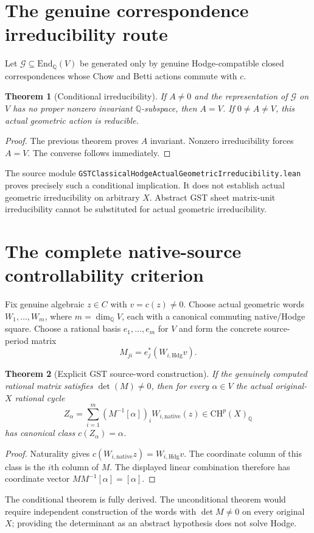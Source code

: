 \documentclass[11pt]{article}
\newcommand{\Q}{\mathbb Q}
\newcommand{\CH}{\mathrm{CH}}
\newcommand{\Hdg}{\mathrm{Hdg}}
\newtheorem{theorem}{Theorem}
\begin{document}
\section{The genuine correspondence irreducibility route}
Let $\mathscr G\subseteq\mathrm{End}_{\Q}(V)$ be generated
only by genuine Hodge-compatible closed correspondences whose
Chow and Betti actions commute with $c$.
\begin{theorem}[Conditional irreducibility]
If $A\ne0$ and the representation of $\mathscr G$ on $V$
has no proper nonzero invariant $\Q$-subspace, then $A=V$.
If $0\ne A\ne V$, this actual geometric action is reducible.
\end{theorem}
\begin{proof}
The previous theorem proves $A$ invariant. Nonzero
irreducibility forces $A=V$. The converse follows immediately.
\end{proof}
The source module
\texttt{GSTClassicalHodgeActualGeometricIrreducibility.lean}
proves precisely such a conditional implication.
It does not establish actual geometric irreducibility on
arbitrary $X$. Abstract GST sheet matrix-unit irreducibility
cannot be substituted for actual geometric irreducibility.

\section{The complete native-source controllability criterion}
Fix genuine algebraic $z\in C$ with $v=c(z)\ne0$.
Choose actual geometric words $W_1,\ldots,W_m$,
where $m=\dim_{\Q}V$, each with a canonical commuting
native/Hodge square. Choose a rational basis $e_1,\ldots,e_m$
for $V$ and form the concrete source-period matrix
\[
 M_{ji}=e_j^*(W_{i,\Hdg}v).
\]
\begin{theorem}[Explicit GST source-word construction]
If the genuinely computed rational matrix satisfies
$\det(M)\ne0$, then for every $\alpha\in V$ the actual
original-$X$ rational cycle
\[
 Z_\alpha=\sum_{i=1}^m
 (M^{-1}[\alpha])_i W_{i,\mathrm{native}}(z)
 \in\CH^p(X)_{\Q}
\]
has canonical class $c(Z_\alpha)=\alpha$.
\end{theorem}
\begin{proof}
Naturality gives
$c(W_{i,\mathrm{native}}z)=W_{i,\Hdg}v$.
The coordinate column of this class is the $i$th
column of $M$. The displayed linear combination
therefore has coordinate vector
$M M^{-1}[\alpha]=[\alpha]$.
\end{proof}
The conditional theorem is fully derived. The
unconditional theorem would require independent construction
of the words with $\det M\ne0$ on every original $X$;
providing the determinant as an abstract hypothesis
does not solve Hodge.
\end{document}
